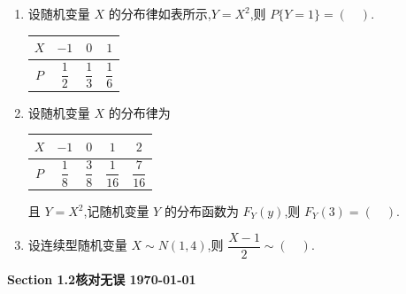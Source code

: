 \begin{enumerate}
  \item 设随机变量 $X$ 的分布律如表所示,$Y=X^{2}$,则 $P\{Y=1\}=(\quad)$.
  \begin{center}
    \begin{tabular}{c c c c}
      \toprule
      $X$ & $-1$ & $0$ & $1$ \\
      \midrule
      $P$ & $\dfrac{1}{2}$ & $\dfrac{1}{3}$ & $\dfrac{1}{6}$ \\
      \bottomrule
    \end{tabular}
  \end{center}

  \item 设随机变量 $X$ 的分布律为
  \begin{center}
    \begin{tabular}{c c c c c}
      \toprule
      $X$ & $-1$ & $0$ & $1$ & $2$ \\
      \midrule
      $P$ & $\dfrac{1}{8}$ & $\dfrac{3}{8}$ & $\dfrac{1}{16}$ & $\dfrac{7}{16}$ \\
      \bottomrule
    \end{tabular}
  \end{center}
  且 $Y=X^{2}$,记随机变量 $Y$ 的分布函数为 $F_Y(y)$,则 $F_Y(3)=(\quad)$.

  \item 设连续型随机变量 $X\sim N(1,4)$,则 $\dfrac{X-1}{2}\sim(\quad)$.
\end{enumerate}

\begin{center}
    \color{red}
    \textbf{Section 1.2核对无误 \today}
\end{center}
